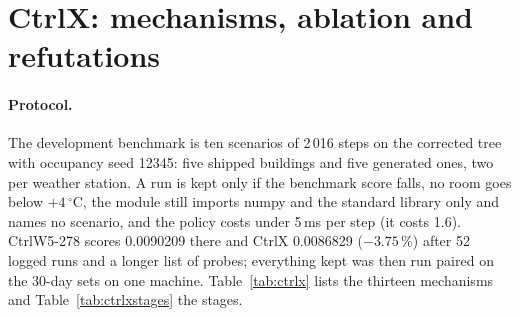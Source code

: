 \documentclass{article}
\begin{document}
\section{CtrlX: mechanisms, ablation and refutations}
\label{app:ctrlx}

\paragraph{Protocol.} The development benchmark is ten scenarios of 2\,016 steps on the corrected
tree with occupancy seed 12345: five shipped buildings and five generated ones, two per weather
station. A run is kept only if the benchmark score falls, no room goes below $+4\,^\circ$C, the
module still imports numpy and the standard library only and names no scenario, and the policy
costs under 5\,ms per step (it costs 1.6). CtrlW5-278 scores 0.0090209 there and CtrlX 0.0086829
($-3.75\,\%$) after 52 logged runs and a longer list of probes; everything kept was then run paired
on the 30-day sets on one machine. Table~\ref{tab:ctrlx} lists the thirteen mechanisms and
Table~\ref{tab:ctrlxstages} the stages.
\end{document}
